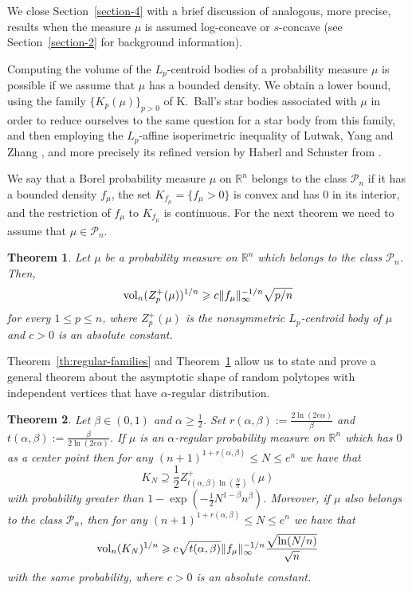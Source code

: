 \documentclass[11pt,leqno]{article}
\newtheorem{theorem}{Theorem}[section]
\theoremstyle{definition}
\theoremstyle{remark}
\numberwithin{equation}{section}
\newcommand{\vol}{{\rm vol}}
\newcommand{\ls}{\leqslant}
\newcommand{\gr}{\geqslant}
\newcommand{\1}{\textbf{1}}
\begin{document}
We close Section~\ref{section-4} with a brief discussion of analogous, more precise, results when the measure $\mu$ is assumed
log-concave or $s$-concave (see Section~\ref{section-2} for background information).

\smallskip

Computing the volume of the $L_p$-centroid bodies of a probability measure $\mu$ is possible if we assume
that $\mu$ has a bounded density. We obtain a lower bound, using the family $\{K_p(\mu)\}_{p>0}$
of K.~Ball's star bodies associated with $\mu$ in order to reduce ourselves to the same question for
a star body from this family, and then employing the $L_p$-affine isoperimetric
inequality of Lutwak, Yang and Zhang \cite{Lutwak-Yang-Zhang-2000}, and more precisely
its refined version by Haberl and Schuster from \cite{Haberl-Schuster-2009}.

We say that a Borel probability measure $\mu$ on $\mathbb{R}^n$ belongs to the class $\mathcal{P}_n$ if
it has a bounded density $f_\mu$, the set $K_{f_\mu}=\{f_\mu>0\}$ is convex and has $0$ in its interior,
and the restriction of $f_\mu$ to $K_{f_\mu}$ is continuous. For the next theorem we need to assume
that $\mu\in\mathcal{P}_n$.

\begin{theorem}\label{th:volume}
Let $\mu$ be a probability measure on $\mathbb{R}^n$ which belongs to the class $\mathcal{P}_n$. Then,
\begin{equation*}\vol_n(Z_p^+(\mu))^{1/n}\gr c\|f_{\mu}\|_{\infty}^{-1/n}\sqrt{p/n}\end{equation*}
for every $1\ls p\ls n$, where $Z_p^+(\mu)$ is the nonsymmetric $L_p$-centroid body of $\mu$ and $c>0$ is an absolute constant.
\end{theorem}

Theorem~\ref{th:regular-families} and Theorem~\ref{th:volume} allow
us to state and prove a general theorem about the asymptotic shape of random
polytopes with independent vertices that have $\alpha $-regular distribution.

\begin{theorem}\label{th:intro-regular-size}Let $\beta\in (0,1)$ and $\alpha\gr\frac{1}{2}$. Set
$r(\alpha,\beta):=\frac{2\ln(2e\alpha)}{\beta}$ and $t(\alpha,\beta):=\frac{\beta}{2\ln(2e\alpha)}$.
If $\mu $ is an $\alpha$-regular probability measure on $\mathbb{R}^n$ which has $0$ as a center point then
for any $(n+1)^{1+r(\alpha,\beta)}\ls N\ls e^n$
we have that
$$K_N\supseteq \frac{1}{2} Z_{t(\alpha,\beta)\ln\left(\frac{N}{n}\right)}^+(\mu)$$
with probability greater than $1-\exp(-\tfrac{1}{2}N^{1-\beta}n^{\beta})$.
Moreover, if $\mu$ also belongs to the class  $\mathcal{P}_n$, then
for any $(n+1)^{1+r(\alpha,\beta)}\ls N\ls e^n$ we have that
$$\vol_n(K_N)^{1/n}\gr c\sqrt{t(\alpha,\beta)}\|f_{\mu}\|_{\infty}^{-1/n}\frac{\sqrt{\ln(N/n)}}{\sqrt{n}}$$
with the same probability, where $c>0$ is an absolute constant.
\end{theorem}
\end{document}

